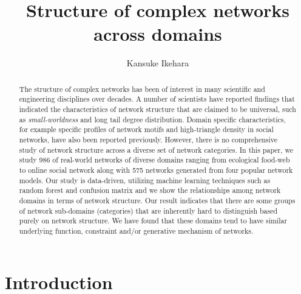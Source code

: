 \documentclass{article}
\begin{document}
\title{Structure of complex networks across domains}
\author{Kansuke Ikehara}
\maketitle

\begin{abstract}
The structure of complex networks has been of interest in many scientific and engineering disciplines over decades. A number of scientists have reported findings that indicated the characteristics of network structure that are claimed to be universal, such as \textit{small-worldness} and long tail degree distribution. Domain specific characteristics, for example specific profiles of network motifs and high-triangle density in social networks, have also been reported previously. However, there is no comprehensive study of network structure across a diverse set of network categories. In this paper, we study 986 of real-world networks of diverse domains ranging from ecological food-web to online social network along with 575 networks generated from four popular network models. Our study is data-driven, utilizing machine learning techniques such as random forest and confusion matrix and we show the relationships among network domains in terms of network structure. Our result indicates that there are some groups of network sub-domains (categories) that are inherently hard to distinguish based purely on network structure. We have found that these domains tend to have similar underlying function, constraint and/or generative mechanism of networks.
  
\end{abstract}
\tableofcontents

\newpage
\section{Introduction}
\end{document}
